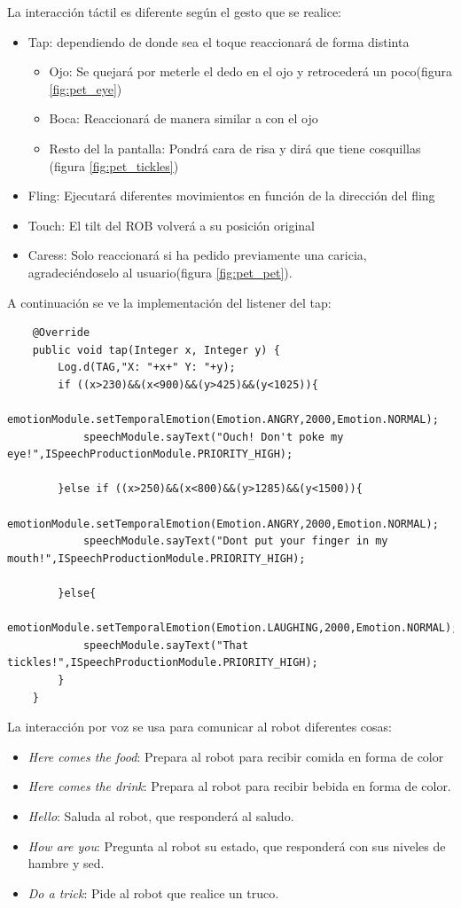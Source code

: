 La interacción táctil es diferente según el gesto que se realice:
\begin{itemize}
	\item Tap: dependiendo de donde sea el toque reaccionará de forma distinta
	\begin{itemize}
		\item Ojo: Se quejará por meterle el dedo en el ojo y retrocederá un poco(figura \ref{fig:pet_eye})
		\item Boca: Reaccionará de manera similar a con el ojo
		\item Resto del la pantalla: Pondrá cara de risa y dirá que tiene cosquillas (figura \ref{fig:pet_tickles})
	\end{itemize}
	\item Fling: Ejecutará diferentes movimientos en función de la dirección del fling
	\item Touch: El tilt del ROB volverá a su posición original
	\item Caress: Solo reaccionará si ha pedido previamente una caricia, agradeciéndoselo al usuario(figura \ref{fig:pet_pet}).
\end{itemize}

A continuación se ve la implementación del listener del tap:
\begin{lstlisting}
	@Override
    public void tap(Integer x, Integer y) {
        Log.d(TAG,"X: "+x+" Y: "+y);
        if ((x>230)&&(x<900)&&(y>425)&&(y<1025)){
            emotionModule.setTemporalEmotion(Emotion.ANGRY,2000,Emotion.NORMAL);
            speechModule.sayText("Ouch! Don't poke my eye!",ISpeechProductionModule.PRIORITY_HIGH);

        }else if ((x>250)&&(x<800)&&(y>1285)&&(y<1500)){
            emotionModule.setTemporalEmotion(Emotion.ANGRY,2000,Emotion.NORMAL);
            speechModule.sayText("Dont put your finger in my mouth!",ISpeechProductionModule.PRIORITY_HIGH);

        }else{
            emotionModule.setTemporalEmotion(Emotion.LAUGHING,2000,Emotion.NORMAL);
            speechModule.sayText("That tickles!",ISpeechProductionModule.PRIORITY_HIGH);
        }
    }
\end{lstlisting}

La interacción por voz se usa para comunicar al robot diferentes cosas:
\begin{itemize}
	\item \textit{Here comes the food}: Prepara al robot para recibir comida en forma de color
	\item \textit{Here comes the drink}: Prepara al robot para recibir bebida en forma de color.
	\item \textit{Hello}: Saluda al robot, que responderá al saludo.
	\item \textit{How are you}: Pregunta al robot su estado, que responderá con sus niveles de hambre y sed.
	\item \textit{Do a trick}: Pide al robot que realice un truco.
\end{itemize}


